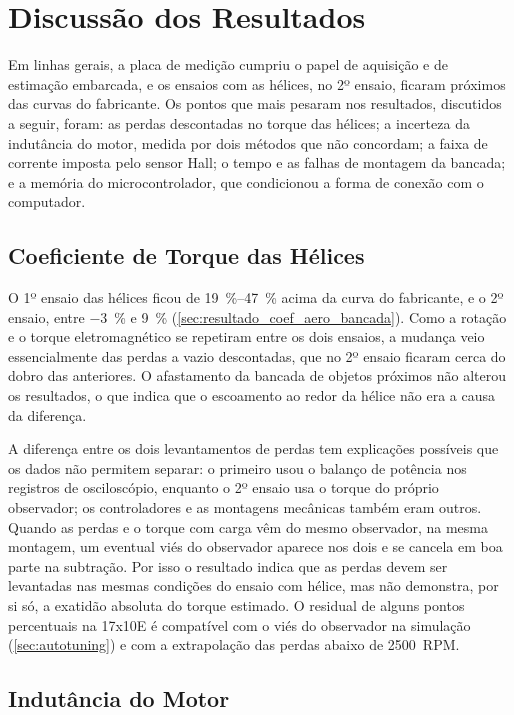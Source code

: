 \section{Discussão dos Resultados}
\label{sec:discussao}

Em linhas gerais, a placa de medição cumpriu o papel de aquisição e de
estimação embarcada, e os ensaios com as hélices, no 2º ensaio, ficaram próximos das curvas do fabricante. Os pontos que mais pesaram
nos resultados, discutidos a seguir, foram: as perdas descontadas no
torque das hélices; a incerteza da indutância do motor, medida por dois métodos que não
concordam; a faixa de corrente imposta pelo sensor Hall; o tempo e as falhas
de montagem da bancada; e a memória do microcontrolador, que condicionou a
forma de conexão com o computador.

\subsection{Coeficiente de Torque das Hélices}
\label{sec:discussao_helices}

O 1º ensaio das hélices ficou de \SIrange{19}{47}{\percent} acima da
curva do fabricante, e o 2º ensaio, entre \SI{-3}{\percent} e \SI{+9}{\percent}
(\autoref{sec:resultado_coef_aero_bancada}). Como a rotação e o torque
eletromagnético se repetiram entre os dois ensaios, a mudança veio
essencialmente das perdas a vazio descontadas, que no 2º ensaio
ficaram cerca do dobro das anteriores. O afastamento da bancada de objetos
próximos não alterou os resultados, o que indica que o escoamento ao redor da
hélice não era a causa da diferença.

A diferença entre os dois levantamentos de perdas tem explicações possíveis
que os dados não permitem separar: o primeiro usou o balanço de potência nos
registros de osciloscópio, enquanto o 2º ensaio usa o torque do próprio
observador; os controladores e as montagens mecânicas também eram outros.
Quando as perdas e o torque com carga vêm do mesmo observador, na mesma
montagem, um eventual viés do observador aparece nos dois e se cancela em boa
parte na subtração. Por isso o resultado indica que as perdas devem ser
levantadas nas mesmas condições do ensaio com hélice, mas não demonstra, por
si só, a exatidão absoluta do torque estimado. O residual de alguns pontos
percentuais na 17x10E é compatível com o viés do observador na simulação
(\autoref{sec:autotuning}) e com a extrapolação das perdas abaixo de
\SI{2500}{RPM}.

\subsection{Indutância do Motor}
\label{sec:discussao_indutancia}

